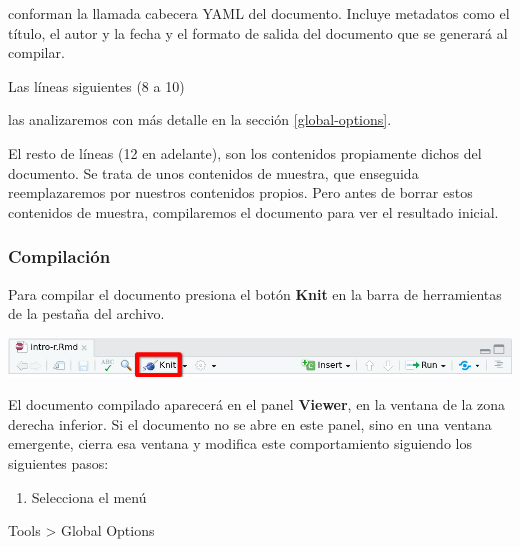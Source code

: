 \documentclass[
  degree=mecinf,
  title=normal,
  toc=normal,
  bib=normal]{mnye}
\providecommand{\tightlist}{%
  \setlength{\itemsep}{0pt}\setlength{\parskip}{0pt}}
\newenvironment{Shaded}{\begin{snugshade}}{\end{snugshade}}
\newcommand{\InformationTok}[1]{\textcolor[rgb]{0.56,0.35,0.01}{\textbf{\textit{#1}}}}
\begin{document}
conforman la llamada cabecera YAML del documento. Incluye metadatos como el título, el autor y la fecha y el formato de salida del documento que se generará al compilar.

Las líneas siguientes (8 a 10)

\begin{Shaded}
\end{Shaded}

las analizaremos con más detalle en la sección \ref{global-options}.

El resto de líneas (12 en adelante), son los contenidos propiamente dichos del documento. Se trata de unos contenidos de muestra, que enseguida reemplazaremos por nuestros contenidos propios. Pero antes de borrar estos contenidos de muestra, compilaremos el documento para ver el resultado inicial.

\hypertarget{compilaciuxf3n}{%
\subsubsection{Compilación}\label{compilaciuxf3n}}

Para compilar el documento presiona el botón \textbf{Knit} en la barra de herramientas de la pestaña del archivo.

\begin{center}\includegraphics[width=1\linewidth]{images/knit} \end{center}

El documento compilado aparecerá en el panel \textbf{Viewer}, en la ventana de la zona derecha inferior.
Si el documento no se abre en este panel, sino en una ventana emergente, cierra esa ventana y modifica este comportamiento siguiendo los siguientes pasos:

\begin{enumerate}
\def\labelenumi{\arabic{enumi}.}
\tightlist
\item
  Selecciona el menú
\end{enumerate}

\begin{menu}
Tools \textgreater{} Global Options

\end{menu}
\end{document}
